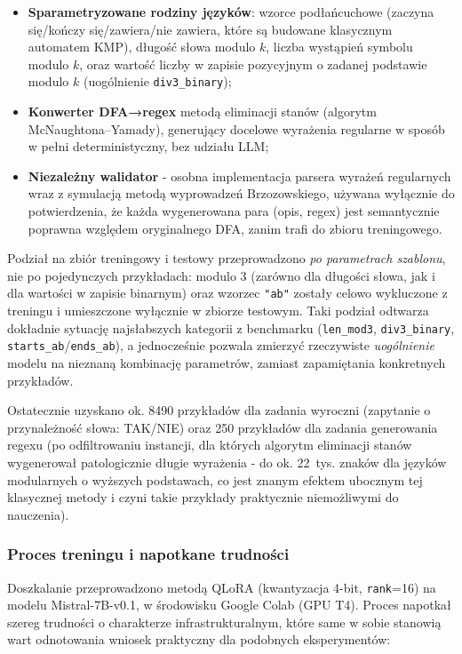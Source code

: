 \documentclass[12pt]{article}
\begin{document}
\begin{itemize}
    \item \textbf{Sparametryzowane rodziny języków}: wzorce podłańcuchowe (zaczyna się/kończy się/zawiera/nie zawiera, które są budowane klasycznym automatem KMP), długość słowa modulo $k$, liczba wystąpień symbolu modulo $k$, oraz wartość liczby w zapisie pozycyjnym o zadanej podstawie modulo $k$ (uogólnienie \texttt{div3\_binary});
    \item \textbf{Konwerter DFA→regex} metodą eliminacji stanów (algorytm McNaughtona--Yamady), generujący docelowe wyrażenia regularne w sposób w pełni deterministyczny, bez udziału LLM;
    \item \textbf{Niezależny walidator} - osobna implementacja parsera wyrażeń regularnych wraz z symulacją metodą wyprowadzeń Brzozowskiego, używana wyłącznie do potwierdzenia, że każda wygenerowana para (opis, regex) jest semantycznie poprawna względem oryginalnego DFA, zanim trafi do zbioru treningowego.
\end{itemize}

Podział na zbiór treningowy i testowy przeprowadzono \emph{po parametrach szablonu}, nie po pojedynczych przykładach: modulo 3 (zarówno dla długości słowa, jak i dla wartości w zapisie binarnym) oraz wzorzec \texttt{"ab"} zostały celowo wykluczone z treningu i umieszczone wyłącznie w zbiorze testowym. Taki podział odtwarza dokładnie sytuację najsłabszych kategorii z benchmarku (\texttt{len\_mod3}, \texttt{div3\_binary}, \texttt{starts\_ab}/\texttt{ends\_ab}), a jednocześnie pozwala zmierzyć rzeczywiste \emph{uogólnienie} modelu na nieznaną kombinację parametrów, zamiast zapamiętania konkretnych przykładów.

Ostatecznie uzyskano ok. 8490 przykładów dla zadania wyroczni (zapytanie o przynależność słowa: TAK/NIE) oraz 250 przykładów dla zadania generowania regexu (po odfiltrowaniu instancji, dla których algorytm eliminacji stanów wygenerował patologicznie długie wyrażenia - do ok. 22~tys. znaków dla języków modularnych o wyższych podstawach, co jest znanym efektem ubocznym tej klasycznej metody i czyni takie przykłady praktycznie niemożliwymi do nauczenia).

\subsubsection{Proces treningu i napotkane trudności}

Doszkalanie przeprowadzono metodą QLoRA (kwantyzacja 4-bit, \texttt{rank}=16) na modelu Mistral-7B-v0.1, w środowisku Google Colab (GPU T4). Proces napotkał szereg trudności o charakterze infrastrukturalnym, które same w sobie stanowią wart odnotowania wniosek praktyczny dla podobnych eksperymentów:
\end{document}
